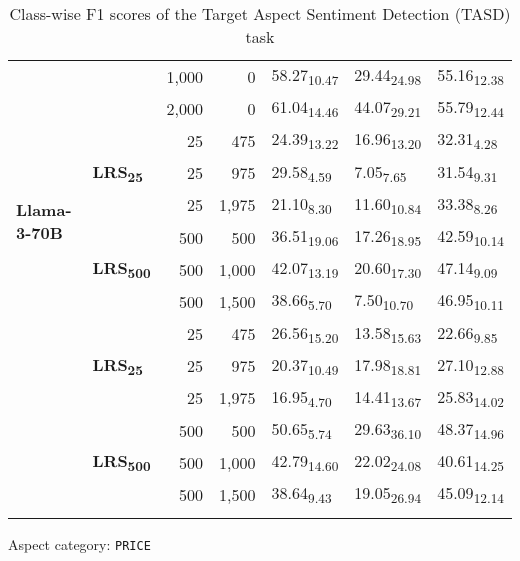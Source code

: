 \begin{table}[H]
\begin{subtable}{\linewidth}
{\begin{tabular}{llrrlll}
 &  & 1,000 & 0 & 58.27\textsubscript{10.47} & 29.44\textsubscript{24.98} & 55.16\textsubscript{12.38} \\
 &  & 2,000 & 0 & 61.04\textsubscript{14.46} & 44.07\textsubscript{29.21} & 55.79\textsubscript{12.44} \\
\hline
\multirow{6}{*}{\textbf{Llama-3-70B}} & \multirow{3}{*}{\textbf{LRS\textsubscript{25}}} & 25 & 475 & 24.39\textsubscript{13.22} & 16.96\textsubscript{13.20} & 32.31\textsubscript{4.28} \\
 &  & 25 & 975 & 29.58\textsubscript{4.59} & 7.05\textsubscript{7.65} & 31.54\textsubscript{9.31} \\
 &  & 25 & 1,975 & 21.10\textsubscript{8.30} & 11.60\textsubscript{10.84} & 33.38\textsubscript{8.26} \\
\arrayrulecolor{gray}\cline{2-7}\arrayrulecolor{black}
 & \multirow{3}{*}{\textbf{LRS\textsubscript{500}}} & 500 & 500 & 36.51\textsubscript{19.06} & 17.26\textsubscript{18.95} & 42.59\textsubscript{10.14} \\
 &  & 500 & 1,000 & 42.07\textsubscript{13.19} & 20.60\textsubscript{17.30} & 47.14\textsubscript{9.09} \\
 &  & 500 & 1,500 & 38.66\textsubscript{5.70} & 7.50\textsubscript{10.70} & 46.95\textsubscript{10.11} \\
\arrayrulecolor{gray}\cline{2-7}\arrayrulecolor{black}
\hline
\multirow{6}{*}{\textbf{GPT-3.5-turbo}} & \multirow{3}{*}{\textbf{LRS\textsubscript{25}}} & 25 & 475 & 26.56\textsubscript{15.20} & 13.58\textsubscript{15.63} & 22.66\textsubscript{9.85} \\
 &  & 25 & 975 & 20.37\textsubscript{10.49} & 17.98\textsubscript{18.81} & 27.10\textsubscript{12.88} \\
 &  & 25 & 1,975 & 16.95\textsubscript{4.70} & 14.41\textsubscript{13.67} & 25.83\textsubscript{14.02} \\
\arrayrulecolor{gray}\cline{2-7}\arrayrulecolor{black}
 & \multirow{3}{*}{\textbf{LRS\textsubscript{500}}} & 500 & 500 & 50.65\textsubscript{5.74} & 29.63\textsubscript{36.10} & 48.37\textsubscript{14.96} \\
 &  & 500 & 1,000 & 42.79\textsubscript{14.60} & 22.02\textsubscript{24.08} & 40.61\textsubscript{14.25} \\
 &  & 500 & 1,500 & 38.64\textsubscript{9.43} & 19.05\textsubscript{26.94} & 45.09\textsubscript{12.14} \\
\arrayrulecolor{gray}\cline{2-7}\arrayrulecolor{black}
\hline
\end{tabular}
}
\caption{Aspect category: \texttt{PRICE}}
\end{subtable}
\caption{Class-wise F1 scores of the Target Aspect Sentiment Detection (TASD) task}
\end{table}

